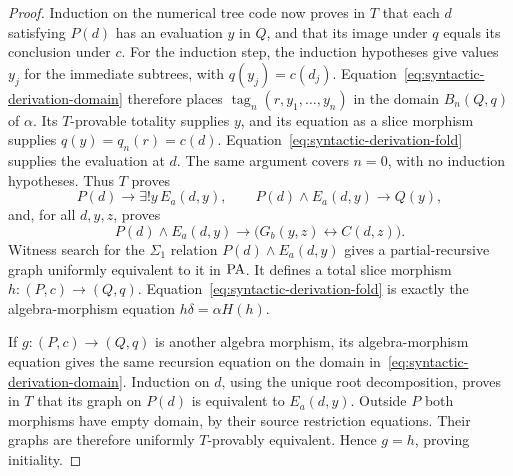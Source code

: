 \begin{proof}
Induction on the numerical tree code now proves in $T$ that
each $d$ satisfying $P(d)$ has an evaluation $y$ in $Q$, and
that its image under $q$ equals its conclusion under $c$.
For the induction step, the induction hypotheses give values
$y_j$ for the immediate subtrees, with
$q(y_j)=c(d_j)$.  Equation~\eqref{eq:syntactic-derivation-domain}
therefore places
$\operatorname{tag}_n(r,y_1,\ldots,y_n)$ in the domain
$B_n(Q,q)$ of $\alpha$.  Its $T$-provable totality supplies
$y$, and its equation as a slice morphism supplies
$q(y)=q_n(r)=c(d)$.  Equation~\eqref{eq:syntactic-derivation-fold}
supplies the evaluation at $d$.  The same argument covers
$n=0$, with no induction hypotheses.
Thus $T$ proves
\[
 P(d)\longrightarrow\exists!y\,E_a(d,y),
 \qquad
 P(d)\land E_a(d,y)\longrightarrow Q(y),
\]
and, for all $d,y,z$, proves
\[
 P(d)\land E_a(d,y)
 \longrightarrow\bigl(G_b(y,z)\leftrightarrow C(d,z)\bigr).
\]
Witness search for the $\Sigma_1$ relation
$P(d)\land E_a(d,y)$ gives a partial-recursive graph uniformly
equivalent to it in $\mathrm{PA}$.  It defines a total slice morphism
$h:(P,c)\to(Q,q)$.  Equation~\eqref{eq:syntactic-derivation-fold}
is exactly the algebra-morphism equation
$h\delta=\alpha H(h)$.

If $g:(P,c)\to(Q,q)$ is another algebra morphism, its
algebra-morphism equation gives the same recursion equation
on the domain in~\eqref{eq:syntactic-derivation-domain}.
Induction on $d$, using the unique root decomposition, proves
in $T$ that its graph on $P(d)$ is equivalent to $E_a(d,y)$.
Outside $P$ both morphisms have empty domain, by their source
restriction equations.  Their graphs are therefore uniformly
$T$-provably equivalent.  Hence $g=h$, proving initiality.
\end{proof}

